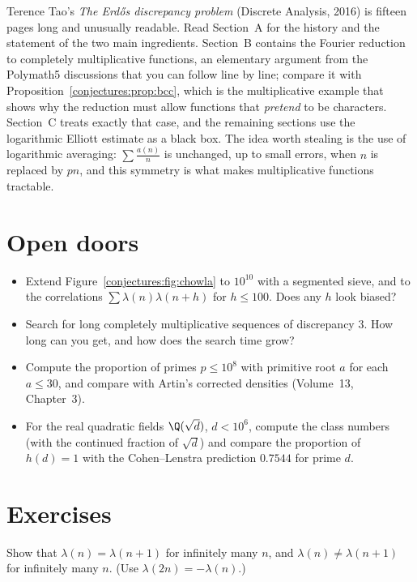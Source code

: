 Terence Tao's \emph{The Erd\H os discrepancy problem} (Discrete Analysis, 2016) is fifteen pages long and unusually readable. Read Section~A for the history and
the statement of the two main ingredients. Section~B contains the Fourier reduction to completely multiplicative functions, an elementary argument from the
Polymath5 discussions that you can follow line by line; compare it with Proposition~\ref{conjectures:prop:bcc}, which is the multiplicative example that shows why the
reduction must allow functions that \emph{pretend} to be characters. Section~C treats exactly that case, and the remaining sections use the logarithmic
Elliott estimate as a black box. The idea worth stealing is the use of logarithmic averaging: $\sum\frac{a(n)}n$ is unchanged, up to small errors, when $n$ is
replaced by $pn$, and this symmetry is what makes multiplicative functions tractable.

\section{Open doors}

\begin{itemize}
\item Extend Figure~\ref{conjectures:fig:chowla} to $10^{10}$ with a segmented sieve, and to the correlations $\sum\lambda(n)\lambda(n+h)$ for $h\le100$. Does any $h$
look biased?
\item Search for long completely multiplicative sequences of discrepancy $3$. How long can you get, and how does the search time grow?
\item Compute the proportion of primes $p\le10^8$ with primitive root $a$ for each $a\le30$, and compare with Artin's corrected densities (Volume~13, Chapter~3).
\item For the real quadratic fields $\Q(\sqrt d)$, $d<10^6$, compute the class numbers (with the continued fraction of $\sqrt d$) and compare the proportion
of $h(d)=1$ with the Cohen--Lenstra prediction $0.7544$ for prime $d$.
\end{itemize}

\section{Exercises}

\begin{exercise}[$\star$]\label{conjectures:ex:signflip}
Show that $\lambda(n)=\lambda(n+1)$ for infinitely many $n$, and $\lambda(n)\ne\lambda(n+1)$ for infinitely many $n$. (Use $\lambda(2n)=-\lambda(n)$.)
\end{exercise}

